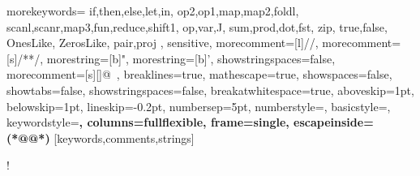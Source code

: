 \usepackage{todonotes}
\newcommand{\TODO}[1]{\todo[inline,author=TODO]{#1}}
\newcommand{\AS}[1]{\todo[inline,author=AS]{#1}}
\newcommand{\as}[1]{\todo[size=\tiny]{as: #1}{}}
\newcommand{\SSS}[1]{\todo[inline,author=SS]{#1}}
\newcommand{\sss}[1]{\todo[size=\tiny]{ss: #1}{}}
\newcommand{\EA}[1]{\todo[inline,author=EA]{#1}}
\newcommand{\ea}[1]{\todo[size=\tiny]{ea: #1}{}}
\newcommand{\MH}[1]{\todo[inline,author=MH]{#1}}
\newcommand{\mh}[1]{\todo[size=\tiny]{mh: #1}{}}

\usepackage{amsmath}
\usepackage{mathtools}
\usepackage{suffix}
\usepackage{tikz-cd}
\usepackage{mathpartir}
\usepackage{enumitem}
\usepackage{stmaryrd}
\usepackage[all]{xy}
\usepackage{twoopt}
\usepackage{array}
\usepackage{listings}
\usepackage{multirow}

%
{morekeywords={
  if,then,else,let,in,
  op2,op1,map,map2,foldl,
  scanl,scanr,map3,fun,reduce,shift1,
  op,var,J,
  sum,prod,dot,fst,
  zip,
  true,false,
  OnesLike,
  ZerosLike,
  pair,proj
  },%
  sensitive,%
  morecomment=[l]//,%
  morecomment=[s]{/*}{*/},%
  morestring=[b]",%
  morestring=[b]',%
  showstringspaces=false,%
  morecomment=[s][\color{gray}]{@}{\ },%
    breaklines=true,%
  mathescape=true,%
showspaces=false,
showtabs=false,
showstringspaces=false,
breakatwhitespace=true,
  aboveskip=1pt,
  belowskip=1pt,
  lineskip=-0.2pt,
   numbersep=5pt,
   numberstyle=\tiny\ttfamily,
   basicstyle=\small\ttfamily,
   keywordstyle=\bfseries\color{blue!70!black},%
   columns=fullflexible,
  frame=single,
  escapeinside={(*@}{@*)}
}[keywords,comments,strings]%

\lstset{language=llql}
\lstMakeShortInline[columns=fixed]!


\newcommand{\system}{RAD\xspace}
\newcommand{\dfsmooth}{$\text{d}\widetilde{\textsc{f}}$\xspace}
\newcommand{\supfull}{\CIRCLE}
\newcommand{\suphalf}{\LEFTcircle}
\newcommand{\supnone}{\Circle}
\newcommand{\supfullstar}{\hspace{1ex}\supfull*}
\newcommand{\notexists}{-}
\newcommand{\RR}{\mathbb{R}}

\newtheorem{notation}{Notation}
\newtheorem{remark}{Remark}

\newcommand{\code}[1]{\texttt{#1}}

\newcommand{\dif}{\mathop{}\!\mathrm{d}}
\newcommand{\Diff}{\mathbf{Diff}}
\newcommand{\sem}[1]{\llbracket #1\rrbracket}
\newcommand{\semgl}[1]{\llparenthesis #1\rrparenthesis}
\newcommand{\defeq}{\stackrel {\mathrm{def}}=}

\makeatletter
\newcommand\@TyAlph[1]{%
\ifcase #1\or \tau\or \sigma\or \rho\else \@ctrerr \fi%
}
\newcommand\ty[1][1]{{\@TyAlph{#1}}}

